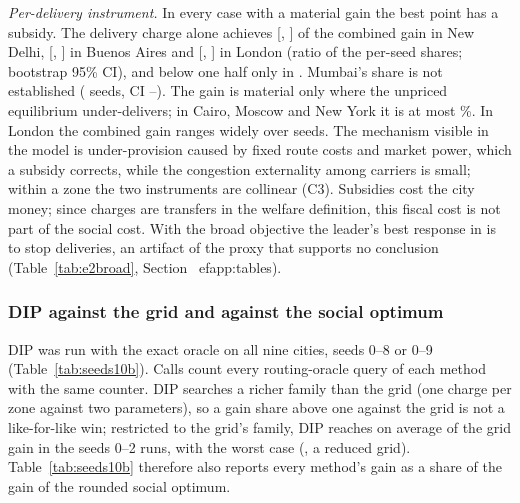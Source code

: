 \documentclass[preprint,11pt]{elsarticle}
\theoremstyle{definition}
\theoremstyle{remark}
\begin{document}
\emph{Per-delivery instrument.} In every case with a material gain the best point has a subsidy. The delivery charge alone achieves \TenShareNewDelhi{} [\TenShareLoNewDelhi, \TenShareHiNewDelhi] of the combined gain in New Delhi, \TenShareBuenosAires{} [\TenShareLoBuenosAires, \TenShareHiBuenosAires] in Buenos Aires and \TenShareLondon{} [\TenShareLoLondon, \TenShareHiLondon] in London (ratio of the per-seed shares; bootstrap 95\% CI), and below one half only in \TenShareBelowHalf. Mumbai's share is not established (\TenShareMumbaiN{} seeds, CI \TenShareMumbaiLo--\TenShareMumbaiHi). The gain is material only where the unpriced equilibrium under-delivers; in Cairo, Moscow and New York it is at most \EtwoSmallMax\%. In London the combined gain ranges widely over seeds. The mechanism visible in the model is under-provision caused by fixed route costs and market power, which a subsidy corrects, while the congestion externality among carriers is small; within a zone the two instruments are collinear (C3). Subsidies cost the city money; since charges are transfers in the welfare definition, this fiscal cost is not part of the social cost. With the broad objective the leader's best response in \EtwoBroadShutdownCities{} is to stop deliveries, an artifact of the proxy that supports no conclusion (Table~\ref{tab:e2broad}, Section~
ef{app:tables}).

\subsubsection{DIP against the grid and against the social optimum}\label{sec:res-dip}

DIP was run with the exact oracle on all nine cities, seeds 0--8 or 0--9 (Table~\ref{tab:seeds10b}). Calls count every routing-oracle query of each method with the same counter. DIP searches a richer family than the grid (one charge per zone against two parameters), so a gain share above one against the grid is not a like-for-like win; restricted to the grid's family, DIP reaches on average \DipFamMean{} of the grid gain in the seeds 0--2 runs, with the worst case \DipFamMin{} (\DipFamMinCase, a reduced grid). Table~\ref{tab:seeds10b} therefore also reports every method's gain as a share of the gain of the rounded social optimum.

\begin{table}[tbp]\centering\small
\caption{Leader methods, mean over seeds (exact oracle). DIP / grid: DIP gain over the best exact grid point's gain; calls: DIP's oracle calls as a percentage of a 63-point grid at the same calls per point. Gain shares against the social optimum (SO): best grid point, DIP, ARP flat; ARP / DIP gain ratio; $n_{\rm ARP}$ seeds with an ARP run. $^*$: reduced exact grid (lower bounds for the grid column). Shares are not reported where the optimum's gain is below 0.5\% of $|$social cost$|$.}\label{tab:seeds10b}
\end{table}
\end{document}
